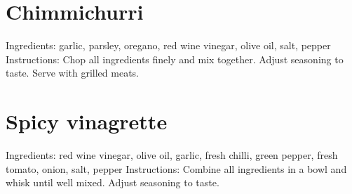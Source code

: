 

\section{Chimmichurri}
Ingredients: garlic, parsley, oregano, red wine vinegar, olive oil, salt, pepper
Instructions: Chop all ingredients finely and mix together. Adjust seasoning to taste. Serve with grilled meats.

\section{Spicy vinagrette}
Ingredients: red wine vinegar, olive oil, garlic, fresh chilli, green pepper, fresh tomato, onion, salt, pepper
Instructions: Combine all ingredients in a bowl and whisk until well mixed. Adjust seasoning to taste.